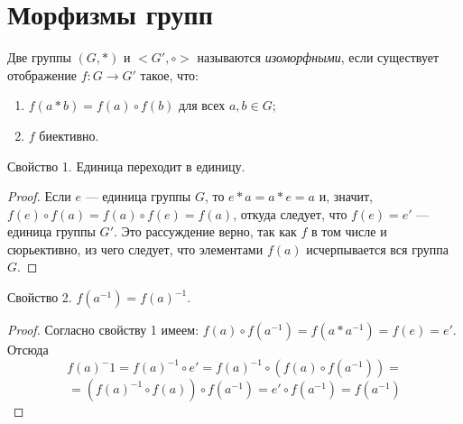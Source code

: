 \section{Морфизмы групп}


\begin{definition}
    Две группы $(G,*)$ и $<G',\circ>$ называются \textit{изоморфными}, если существует отображение $f:G\to G'$ такое, что:
    \begin{enumerate}
        \item $f(a*b)=f(a)\circ f(b)$ для всех $a,b \in G$;
        \item $f$ биективно.
    \end{enumerate}
\end{definition}

\begin{theorem}
    Свойство 1. Единица переходит в единицу.
\end{theorem}
\begin{proof}
    Если $e$ --- единица группы $G$, то $e*a=a*e=a$ и, значит, $f(e)\circ f(a)=f(a)\circ f(e)=f(a)$, откуда следует, что $f(e)=e'$ --- единица группы $G'$. Это рассуждение верно, так как $f$ в том числе и сюрьективно, из чего следует, что элементами $f(a)$ исчерпывается вся группа $G$.
\end{proof}

\begin{theorem}
    Свойство 2. $f(a^{-1})=f(a)^{-1}$.
\end{theorem}
\begin{proof}
    Согласно свойству 1 имеем: $f(a)\circ f(a^{-1})=f(a*a^{-1})=f(e)=e'$. Отсюда
    \begin{equation*}
        f(a)^-1=f(a)^{-1}\circ e'=f(a)^{-1}\circ (f(a)\circ f(a^{-1}))=
    \end{equation*}
    \begin{equation*}
        =(f(a)^{-1}\circ f(a))\circ f(a^{-1})=e'\circ f(a^{-1}) = f(a^{-1})
    \end{equation*}
\end{proof}


